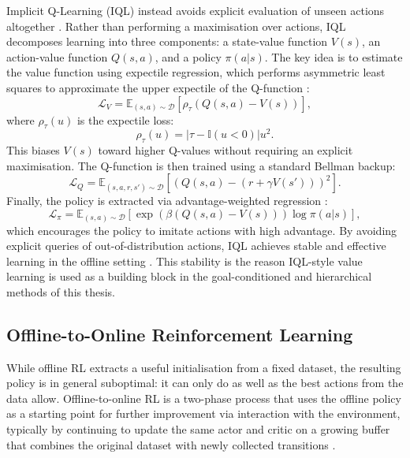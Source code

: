 Implicit Q-Learning (IQL) instead avoids explicit evaluation of unseen actions altogether \cite{kostrikov2021offlinereinforcementlearningimplicit}. Rather than performing a maximisation over actions, IQL decomposes learning into three components: a state-value function $V(s)$, an action-value function $Q(s,a)$, and a policy $\pi(a|s)$.
The key idea is to estimate the value function using expectile regression, which performs asymmetric least squares to approximate the upper expectile of the Q-function \cite{kostrikov2021offlinereinforcementlearningimplicit}:
\begin{equation}
    \mathcal{L}_V = \mathbb{E}_{(s,a) \sim \mathcal{D}} \left[ \rho_\tau \left( Q(s,a) - V(s) \right) \right],
\end{equation}
where $\rho_\tau(u)$ is the expectile loss:
\begin{equation}
    \rho_\tau(u) = |\tau - \mathbb{I}(u < 0)| u^2.
\end{equation}
This biases $V(s)$ toward higher Q-values without requiring an explicit maximisation.
The Q-function is then trained using a standard Bellman backup:
\begin{equation}
    \mathcal{L}_Q = \mathbb{E}_{(s,a,r,s') \sim \mathcal{D}} \left[ \left( Q(s,a) - (r + \gamma V(s')) \right)^2 \right].
\end{equation}
Finally, the policy is extracted via advantage-weighted regression \cite{peng2019advantageweightedregressionsimplescalable,nair2021awacacceleratingonlinereinforcement}:
\begin{equation}
    \mathcal{L}_\pi = \mathbb{E}_{(s,a) \sim \mathcal{D}} \left[ \exp\left( {\beta} (Q(s,a) - V(s)) \right) \log \pi(a|s) \right],
\end{equation}
which encourages the policy to imitate actions with high advantage.
By avoiding explicit queries of out-of-distribution actions, IQL achieves stable and effective learning in the offline setting \cite{kostrikov2021offlinereinforcementlearningimplicit}. This stability is the reason IQL-style value learning is used as a building block in the goal-conditioned and hierarchical methods of this thesis.

\subsection{Offline-to-Online Reinforcement Learning}
\label{sec:offline-online-bg}

While offline RL extracts a useful initialisation from a fixed dataset, the resulting policy is in general suboptimal: it can only do as well as the best actions from the data allow. Offline-to-online RL is a two-phase process that uses the offline policy as a starting point for further improvement via interaction with the environment, typically by continuing to update the same actor and critic on a growing buffer that combines the original dataset with newly collected transitions \cite{nair2021awacacceleratingonlinereinforcement, levine2020offlinereinforcementlearningtutorial, nakamoto2024calqlcalibratedofflinerl}.

